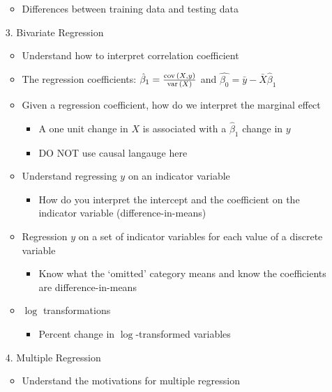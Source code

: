 \documentclass[12pt]{article}
\begin{document}
\begin{enumerate}
\begin{itemize}
    \item Differences between training data and testing data
  \end{itemize}
  
  \vspace{5mm}
  \item[3.] Bivariate Regression
  \begin{itemize}
    \item Understand how to interpret correlation coefficient
    
    \item The regression coefficients: $\hat{\beta}_1 = \frac{\cov{X, y}}{\var{X}}$ and $\hat{\beta_0} = \bar{y} - \bar{X} \hat{\beta}_1$
    
    \item Given a regression coefficient, how do we interpret the marginal effect
    \begin{itemize}
      \item A one unit change in $X$ is associated with a $\hat{\beta}_1$ change in $y$
      \item DO NOT use causal langauge here
    \end{itemize}

    \item Understand regressing $y$ on an indicator variable
    \begin{itemize}
      \item How do you interpret the intercept and the coefficient on the indicator variable (difference-in-means)
    \end{itemize}

    \item Regression $y$ on a set of indicator variables for each value of a discrete variable
    \begin{itemize}
      \item Know what the `omitted' category means and know the coefficients are difference-in-means
    \end{itemize}

    \item $\log$ transformations
    \begin{itemize}
      \item Percent change in $\log$-transformed variables
    \end{itemize}
  \end{itemize}
  
  \vspace{5mm}
  \item[4.] Multiple Regression  
  \begin{itemize}
    \item Understand the motivations for multiple regression
    

\end{itemize}
\end{enumerate}
\end{document}
